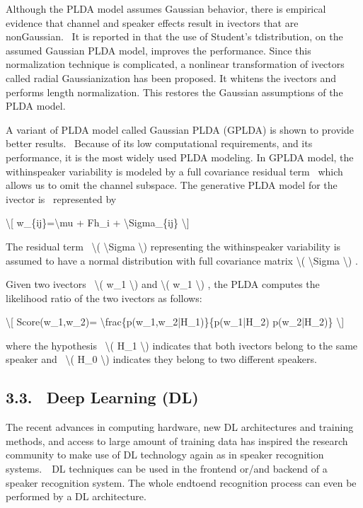 \documentclass[letterpaper,10pt,english]{jupyterBook}
\begin{document}
\sphinxAtStartPar
Although the PLDA model assumes Gaussian behavior, there is empirical
evidence that channel and speaker effects result in i\sphinxhyphen{}vectors that are
non\sphinxhyphen{}Gaussian.  It is reported in that the use of Student’s
t\sphinxhyphen{}distribution, on the assumed Gaussian PLDA model, improves the
performance. Since this normalization technique is complicated, a
non\sphinxhyphen{}linear transformation of i\sphinxhyphen{}vectors called radial Gaussianization has
been proposed. It whitens the i\sphinxhyphen{}vectors and performs length
normalization. This restores the Gaussian assumptions of the PLDA model.

\sphinxAtStartPar
A variant of PLDA model called Gaussian PLDA (GPLDA) is shown to provide
better results.  Because of its low computational requirements, and its
performance, it is the most widely used PLDA modeling. In GPLDA model,
the within\sphinxhyphen{}speaker variability is modeled by a full covariance residual
term  which allows us to omit the channel subspace. The generative PLDA
model for the i\sphinxhyphen{}vector is  represented by

\sphinxAtStartPar
\textbackslash{}{[} w\_\{ij\}=\textbackslash{}mu + Fh\_i + \textbackslash{}Sigma\_\{ij\} \textbackslash{}{]}

\sphinxAtStartPar
The residual term  \textbackslash{}( \textbackslash{}Sigma \textbackslash{}) representing the within\sphinxhyphen{}speaker
variability is assumed to have a normal distribution with full
covariance matrix \textbackslash{}( \textbackslash{}Sigma \textbackslash{}) .

\sphinxAtStartPar
Given two i\sphinxhyphen{}vectors  \textbackslash{}( w\_1 \textbackslash{}) and \textbackslash{}( w\_1 \textbackslash{}) , the PLDA computes the
likelihood ratio of the two i\sphinxhyphen{}vectors as follows:

\sphinxAtStartPar
\textbackslash{}{[} Score(w\_1,w\_2)= \textbackslash{}frac\{p(w\_1,w\_2|H\_1)\}\{p(w\_1|H\_2) p(w\_2|H\_2)\}
\textbackslash{}{]}

\sphinxAtStartPar
where the hypothesis  \textbackslash{}( H\_1 \textbackslash{}) indicates that both i\sphinxhyphen{}vectors belong
to the same speaker and  \textbackslash{}( H\_0 \textbackslash{}) indicates they belong to two
different speakers.


\subsection{3.3.  Deep Learning (DL)}
\label{\detokenize{Recognition/Speaker_Recognition_and_Verification:deep-learning-dl}}
\sphinxAtStartPar
The recent advances in computing hardware, new DL architectures and
training methods, and access to large amount of training data has
inspired the research community to make use of DL technology again as in
speaker recognition systems.  DL techniques can be used in the frontend
or/and backend of a speaker recognition system. The whole end\sphinxhyphen{}to\sphinxhyphen{}end
recognition process can even be performed by a DL architecture.
\end{document}
